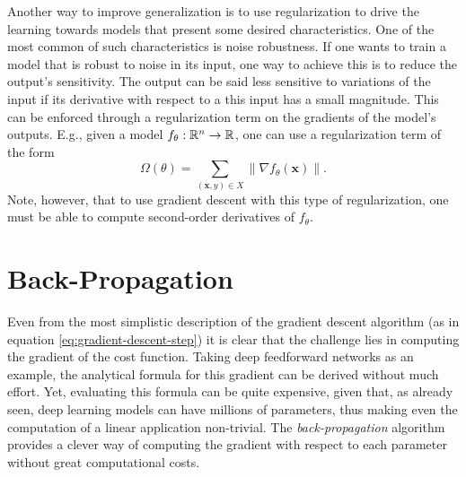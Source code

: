 Another way to improve generalization is to use regularization to drive the learning towards models that present some desired characteristics.
One of the most common of such characteristics is noise robustness.
If one wants to train a model that is robust to noise in its input, one way to achieve this is to reduce the output's sensitivity.
The output can be said less sensitive to variations of the input if its derivative with respect to a this input has a small magnitude.
This can be enforced through a regularization term on the gradients of the model's outputs\cite{drucker_improving_1992}.
E.g., given a model $f_\theta:\mathbb{R}^n\to\mathbb{R}$, one can use a regularization term of the form \[
    \Omega\left( \theta \right) = \sum_{\left( \bm{x},y \right) \in X} \| \nabla f_\theta\left( \bm{x} \right) \|
.\] Note, however, that to use gradient descent with this type of regularization, one must be able to compute second-order derivatives of $f_\theta$.

\section{Back-Propagation}

Even from the most simplistic description of the gradient descent algorithm (as in equation \eqref{eq:gradient-descent-step}) it is clear that the challenge lies in computing the gradient of the cost function.
Taking deep feedforward networks as an example, the analytical formula for this gradient can be derived without much effort.
Yet, evaluating this formula can be quite expensive, given that, as already seen, deep learning models can have millions of parameters, thus making even the computation of a linear application non-trivial.
The \emph{back-propagation} algorithm \cite{rumelhart_learning_1986} provides a clever way of computing the gradient with respect to each parameter without great computational costs.

